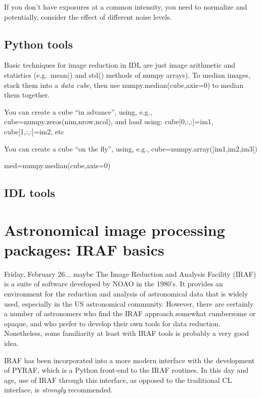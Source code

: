 \documentclass{article}
\begin{document}
If you don't have exposures at a common intensity, you need to
normalize and potentially, consider the effect of different noise
levels.

\subsection*{Python tools}

Basic techniques for image reduction in IDL are just image arithmetic
and statistics (e.g.\ mean() and std() methods of numpy arrays). To
median images, stack them into a \emph{data cube}, then use
numpy.median(cube,axis=0) to median them together.
\begin{itemize*}
    \item You can create a cube ``in advance'', using, e.g.,
        cube=numpy.zeros(nim,nrow,ncol), and load using: cube[0,:,:]=im1,
        cube[1,:,:]=im2, etc
    \item You can create a cube ``on the fly'', using, e.g.,
        cube=numpy.array([im1,im2,im3])
    \item med=numpy.median(cube,axis=0)
\end{itemize*}

\subsection*{IDL tools}



\section*{Astronomical image processing packages: IRAF basics}
\textcolor{date}{Friday, February 26$\ldots$ maybe}
The Image Reduction and Analysis Facility (IRAF) is a suite of
software developed by NOAO in the 1980's. It provides an environment
for the reduction and analysis of astronomical data that is widely
used, especially in the US astronomical community. However, there are
certainly a number of astronomers who find the IRAF approach somewhat
cumbersome or opaque, and who prefer to develop their own tools for
data reduction. Nonetheless, some familiarity at least with IRAF tools
is probably a very good idea.

IRAF has been incorporated into a more modern interface with the
development of PYRAF, which is a Python front-end to the IRAF
routines. In this day and age, use of IRAF through this interface, as
opposed to the traditional CL interface, is \emph{strongly}
recommended.
\end{document}
